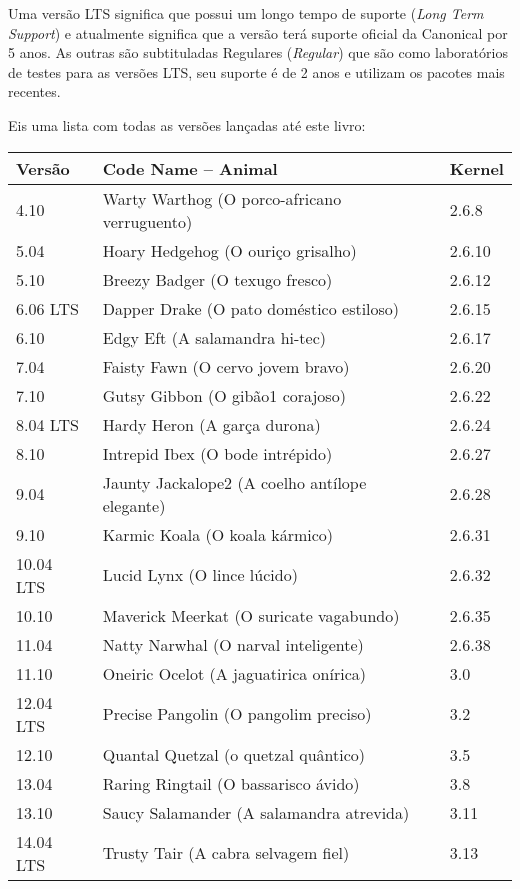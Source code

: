 Uma versão LTS significa que possui um longo tempo de suporte (\textit{Long Term Support}) e atualmente significa que a versão terá suporte oficial da Canonical por 5 anos. As outras são subtituladas Regulares (\textit{Regular}) que são como laboratórios de testes para as versões LTS, seu suporte é de 2 anos e utilizam os pacotes mais recentes.

Eis uma lista com todas as versões lançadas até este livro:
\begin{center}
 \begin{longtable}[h!]{l|l|l}
  \textbf{Versão} & \textbf{Code Name – Animal} & \textbf{Kernel} \\
  \hline
  4.10 & Warty Warthog (O porco-africano verruguento) & 2.6.8 \\
  5.04 & Hoary Hedgehog (O ouriço grisalho) & 2.6.10 \\
  5.10 & Breezy Badger (O texugo fresco) & 2.6.12 \\
  6.06 LTS & Dapper Drake (O pato doméstico estiloso) & 2.6.15 \\
  6.10 & Edgy Eft (A salamandra hi-tec) & 2.6.17 \\
  7.04 & Faisty Fawn (O cervo jovem bravo) & 2.6.20 \\
  7.10 & Gutsy Gibbon (O gibão1 corajoso) & 2.6.22 \\
  8.04 LTS & Hardy Heron (A garça durona) & 2.6.24 \\
  8.10 & Intrepid Ibex (O bode intrépido) & 2.6.27 \\
  9.04 & Jaunty Jackalope2 (A coelho antílope elegante) & 2.6.28 \\
  9.10 & Karmic Koala (O koala kármico) & 2.6.31 \\
  10.04 LTS & Lucid Lynx (O lince lúcido) & 2.6.32 \\
  10.10 & Maverick Meerkat (O suricate vagabundo) & 2.6.35 \\
  11.04 & Natty Narwhal (O narval inteligente) & 2.6.38 \\
  11.10 & Oneiric Ocelot (A jaguatirica onírica) & 3.0 \\
  12.04 LTS & Precise Pangolin (O pangolim preciso) & 3.2 \\
  12.10 & Quantal Quetzal (o quetzal quântico) & 3.5 \\
  13.04 & Raring Ringtail (O bassarisco ávido) & 3.8 \\
  13.10 & Saucy Salamander (A salamandra atrevida) & 3.11 \\
  14.04 LTS & Trusty Tair (A cabra selvagem fiel) & 3.13 \\

\end{longtable}
\end{center}
